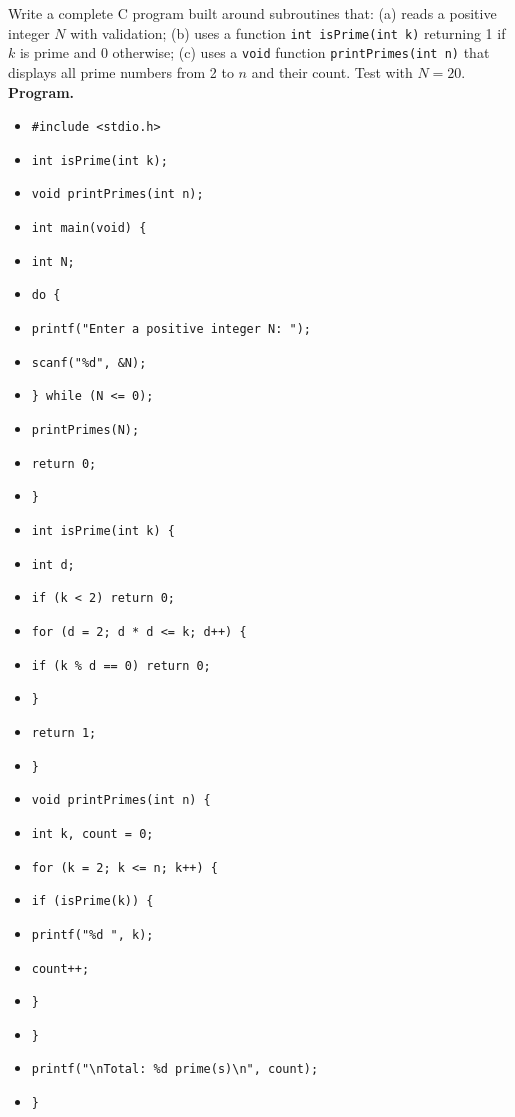 \documentclass[11pt]{article}
\begin{document}
\begin{exoresolu}
Write a complete C program built around subroutines that: (a) reads a positive integer $N$ with validation; (b) uses a function \texttt{int isPrime(int k)} returning 1 if $k$ is prime and 0 otherwise; (c) uses a \texttt{void} function \texttt{printPrimes(int n)} that displays all prime numbers from 2 to $n$ and their count. Test with $N = 20$.
\tcblower
\textbf{Program.}
\begin{itemize}
\item \texttt{\#include <stdio.h>}
\item \texttt{int isPrime(int k);}
\item \texttt{void printPrimes(int n);}
\item \texttt{int main(void) \{}
\item \texttt{\quad int N;}
\item \texttt{\quad do \{}
\item \texttt{\quad\quad printf("Enter a positive integer N: ");}
\item \texttt{\quad\quad scanf("\%d", \&N);}
\item \texttt{\quad \} while (N <= 0);}
\item \texttt{\quad printPrimes(N);}
\item \texttt{\quad return 0;}
\item \texttt{\}}
\item \texttt{int isPrime(int k) \{}
\item \texttt{\quad int d;}
\item \texttt{\quad if (k < 2) return 0;}
\item \texttt{\quad for (d = 2; d * d <= k; d++) \{}
\item \texttt{\quad\quad if (k \% d == 0) return 0;}
\item \texttt{\quad \}}
\item \texttt{\quad return 1;}
\item \texttt{\}}
\item \texttt{void printPrimes(int n) \{}
\item \texttt{\quad int k, count = 0;}
\item \texttt{\quad for (k = 2; k <= n; k++) \{}
\item \texttt{\quad\quad if (isPrime(k)) \{}
\item \texttt{\quad\quad\quad printf("\%d ", k);}
\item \texttt{\quad\quad\quad count++;}
\item \texttt{\quad\quad \}}
\item \texttt{\quad \}}
\item \texttt{\quad printf("\textbackslash nTotal: \%d prime(s)\textbackslash n", count);}
\item \texttt{\}}
\end{itemize}


\end{exoresolu}
\end{document}
